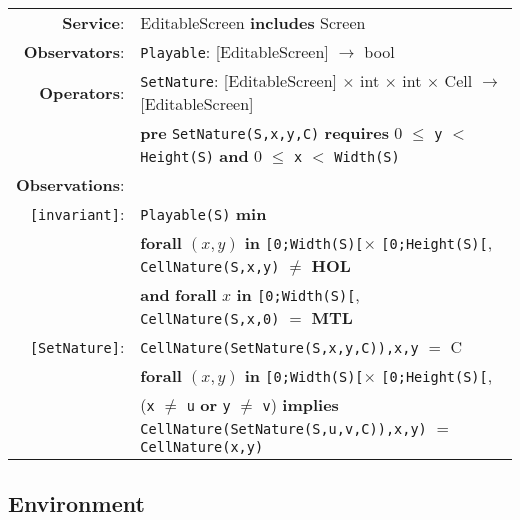 \documentclass[8pt]{article}
\begin{document}
{\small
\begin{longtable}{rl}
  \textbf{Service}: & \textrm{EditableScreen} {\bf includes} \textrm{Screen}  \\
  \textbf{Observators}: & \texttt{Playable}: \textrm{[EditableScreen]} $\rightarrow$ \textrm{bool} \\
  \textbf{Operators}: & \texttt{SetNature}: \textrm{[EditableScreen]} $\times$ \textrm{int} $\times$ \textrm{int} $\times$ \textrm{Cell}  $\rightarrow$ \textrm{[EditableScreen]} \\
  & \quad \textbf{pre } \texttt{SetNature(S,x,y,C)} \textbf{ requires } 0 $\leq$ \texttt{y} $<$ \texttt{Height(S)} \textbf{ and } 0 $\leq$ \texttt{x} $<$ \texttt{Width(S)}\\
  \textbf{Observations}: \\
  \texttt{[invariant]}: & \texttt{Playable(S)} \textbf{min} \\
  & \quad\quad\quad\quad \textbf{forall} $(x,y)$ \textbf{in} \texttt{[0;Width(S)[}$\times$ \texttt{[0;Height(S)[}, \texttt{CellNature(S,x,y)} $\neq$ \textbf{HOL}  \\
          & \quad\quad\quad\quad \textbf{and} \textbf{forall} $x$ \textbf{in} \texttt{[0;Width(S)[}, \texttt{CellNature(S,x,0)} $=$ \textbf{MTL}  \\
              \texttt{[SetNature]}: & \texttt{CellNature(SetNature(S,x,y,C)),x,y} $=$ C \\
              & \textbf{forall} $(x,y)$ \textbf{in} \texttt{[0;Width(S)[}$\times$ \texttt{[0;Height(S)[}, \\ & \quad\quad\quad\quad (\texttt{x} $\neq$ \texttt{u} \textbf{or} \texttt{y} $\neq$ \texttt{v}) \textbf{implies} \texttt{CellNature(SetNature(S,u,v,C)),x,y)} $=$ \texttt{CellNature(x,y)} \\
\end{longtable}}

\subsection{Environment}
\end{document}
